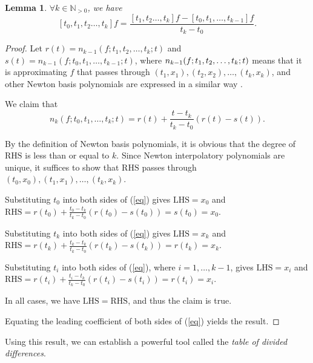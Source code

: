 \documentclass[a4paper,11pt,titlepage]{article}
\theoremstyle{definition}
\theoremstyle{plain}
\newtheorem{lemma}[theorem]{Lemma}
\theoremstyle{remark}
\begin{document}
\begin{lemma}\label{lemma52}
    $\forall k\in\mathbb{N}_{>0}$, we have $$[t_0,t_1,t_2\dots,t_k]f=\frac{[t_1,t_2\dots,t_k]f-[t_0,t_1,\dots,t_{k-1}]f}{t_k-t_0}.$$
\end{lemma}
\begin{proof}
    Let $r(t)=n_{k-1}(f;t_1,t_2,\dots,t_k;t)$ and $s(t)=n_{k-1}(f;t_0,t_1,\dots,t_{k-1};t)$, where $n_{k-1}(f;\\t_1,t_2,\dots,t_k;t)$ means that it is approximating $f$ that passes through $(t_1,x_1), (t_2,x_2), \dots, (t_k,x_k)$, and other Newton basis polynomials are expressed in a similar way \cite{Gautschi2012}.
    
    We claim that
    \begin{equation}\label{eq}
        n_k(f;t_0,t_1,\dots,t_k;t)=r(t)+\frac{t-t_k}{t_k-t_0}(r(t)-s(t)).\tag{*}
    \end{equation}

    By the definition of Newton basis polynomials, it is obvious that the degree of $\mathrm{RHS}$ is less than or equal to $k$. Since Newton interpolatory polynomials are unique, it suffices to show that $\mathrm{RHS}$ passes through $(t_0,x_0), (t_1,x_1), \dots, (t_k,x_k)$.
    
    Substituting $t_0$ into both sides of (\ref{eq}) gives $\mathrm{LHS}=x_0$ and $\mathrm{RHS}=r(t_0)+\frac{t_0-t_k}{t_k-t_0}(r(t_0)-s(t_0))=s(t_0)=x_0.$

    Substituting $t_k$ into both sides of (\ref{eq}) gives $\mathrm{LHS}=x_k$ and $\mathrm{RHS}=r(t_k)+\frac{t_k-t_k}{t_k-t_0}(r(t_k)-s(t_k))=r(t_k)=x_k.$

    Substituting $t_i$ into both sides of (\ref{eq}), where $i=1,\dots,k-1$, gives $\mathrm{LHS}=x_i$ and $\mathrm{RHS}=r(t_i)+\frac{t_i-t_k}{t_k-t_0}(r(t_i)-s(t_i))=r(t_i)=x_i.$

    In all cases, we have $\mathrm{LHS} = \mathrm{RHS}$, and thus the claim is true.

    Equating the leading coefficient of both sides of (\ref{eq}) yields the result.
\end{proof}

Using this result, we can establish a powerful tool called the \textit{table of divided differences}.
\end{document}
